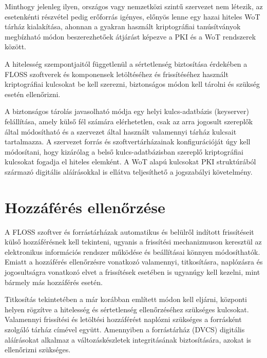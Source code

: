 \documentclass[12pt,magyar,a4paper,oneside]{scrreprt}
\begin{document}
Minthogy jelenleg ilyen, országos vagy nemzetközi szintű szervezet nem
létezik, az esetenkénti részvétel pedig erőforrás igényes, előnyös lenne
egy hazai hiteles WoT tárház kialakítása, ahonnan a gyakran használt
kriptográfiai tanúsítványok megbízható módon beszerezhetőek átjárást
képezve a PKI és a WoT rendszerek között.

A hitelesség szempontjaitól függetlenül a sértetlenség biztosítása
érdekében a FLOSS szoftverek és komponensek letöltéséhez és
frissítéséhez használt kriptográfiai kulcsokat be kell szerezni,
biztonságos módon kell tárolni és szükség esetén ellenőrizni.

A biztonságos tárolás javasolható módja egy helyi kulcs-adatbázis
(keyserver) felállítása, amely külső fél számára elérhetetlen, csak az
arra jogosult szereplők által módosítható és a szervezet által használt
valamennyi tárház kulcsait tartalmazza. A szervezet forrás és
szoftvertárházainak konfigurációját úgy kell módosítani, hogy kizárólag
a belső kulcs-adatbázisban szereplő kriptográfiai kulcsokat fogadja el
hiteles elemként. A WoT alapú kulcsokat PKI struktúrából származó
digitális aláírásokkal is ellátva teljesíthető a jogszabályi
követelmény.

\hypertarget{hozzuxe1fuxe9ruxe9s-ellenux151rzuxe9se}{%
\section{Hozzáférés
ellenőrzése}\label{hozzuxe1fuxe9ruxe9s-ellenux151rzuxe9se}}

A FLOSS szoftver és forrástárházak automatikus és belülről indított
frissítéseit külső hozzáférésnek kell tekinteni, ugyanis a frissítési
mechanizmuson keresztül az elektronikus információs rendszer működése és
beállításai könnyen módosíthatók. Emiatt a hozzáférés ellenőrzésre
vonatkozó valamennyi, titkosításra, naplózásra és jogosultságra
vonatkozó elvet a frissítések esetében is ugyanúgy kell kezelni, mint
bármely más hozzáférés esetén.

Titkosítás tekintetében a már korábban említett módon kell eljárni,
központi helyen rögzítve a hitelesség és sértetlenség ellenőrzéséhez
szükséges kulcsokat. Valamennyi frissítési és letöltési hozzáférést
naplózni szükséges a forrásként szolgáló tárház címével együtt.
Amennyiben a forrástárház (DVCS) digitális aláírásokat alkalmaz a
változáskészletek integritásának biztosítására, azokat is ellenőrizni
szükséges.
\end{document}
